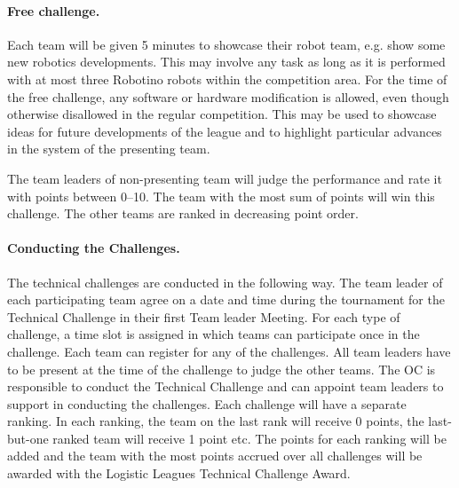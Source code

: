 \documentclass[12pt,twoside]{article}
\begin{document}
\paragraph{Free challenge.~}
Each team will be given 5 minutes to showcase their robot team, e.g.
show some new robotics developments. This may involve any task as long
as it is performed with at most three Robotino robots within the
competition area. For the time of the free challenge, any software or
hardware modification is allowed, even though otherwise disallowed in
the regular competition. This may be used to showcase ideas for future
developments of the league and to highlight particular advances in the
system of the presenting team.

The team leaders of non-presenting team will judge the performance and
rate it with points between 0--10.  The team with the most sum of
points will win this challenge. The other teams are ranked in
decreasing point order.

\paragraph{Conducting the Challenges.~}
The technical challenges are conducted in the following way. The team
leader of each participating team agree on a date and time during the
tournament for the Technical Challenge in their first Team leader
Meeting. For each type of challenge, a time slot is assigned in which
teams can participate once in the challenge. Each team can register
for any of the challenges. All team leaders have to be present at the
time of the challenge to judge the other teams. The OC is responsible
to conduct the Technical Challenge and can appoint team leaders to
support in conducting the challenges. Each challenge will have a
separate ranking. In each ranking, the team on the last rank will
receive 0 points, the last-but-one ranked team will receive 1 point
etc. The points for each ranking will be added and the team with the
most points accrued over all challenges will be awarded with the
Logistic Leagues Technical Challenge Award.






\end{document}
